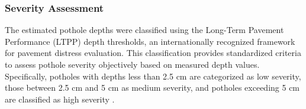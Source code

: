 \subsubsection{Severity Assessment}

The estimated pothole depths were classified using the Long-Term Pavement Performance (LTPP) depth thresholds, an internationally recognized framework for pavement distress evaluation. This classification provides standardized criteria to assess pothole severity objectively based on measured depth values. Specifically, potholes with depths less than 2.5 cm are categorized as low severity, those between 2.5 cm and 5 cm as medium severity, and potholes exceeding 5 cm are classified as high severity \cite{miller2014}.



